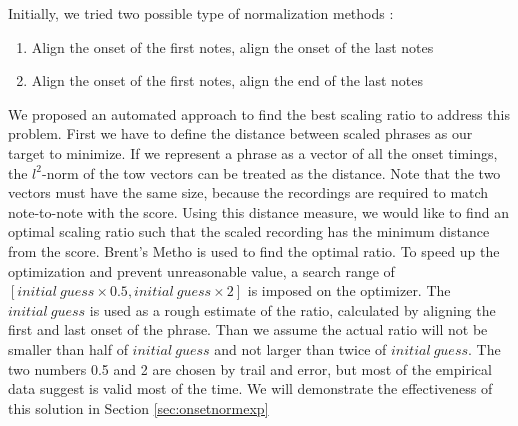 
   Initially, we tried two possible type of normalization methods : 
   \begin{enumerate}
      \item Align the onset of the first notes, align the onset of the last notes
      \item Align the onset of the first notes, align the end of the last notes
   \end{enumerate}
   We proposed an automated approach to find the best scaling ratio to address this problem. First we have to define the distance between scaled phrases as our target to minimize. If we represent a phrase as a vector of all the onset timings, the $l^2$-norm of the tow vectors can be treated as the distance. Note that the two vectors must have the same size, because the recordings are required to match note-to-note with the score. Using this distance measure, we would like to find an optimal scaling ratio such that the scaled recording has the minimum distance from the score. Brent's Metho \cite{brent1973} is used to find the optimal ratio. To speed up the optimization and prevent unreasonable value, a search range of $[initial\ guess \times 0.5 , initial\ guess \times 2]$ is imposed on the optimizer. The $initial\ guess$ is used as a rough estimate of the ratio, calculated by aligning the first and last onset of the phrase. Than we assume the actual ratio will not be smaller than half of $initial\ guess$ and not larger than twice of $initial\ guess$. The two numbers 0.5 and 2 are chosen by trail and error, but most of the empirical data suggest is valid most of the time. We will demonstrate the effectiveness of this solution in Section \ref{sec:onsetnormexp}
